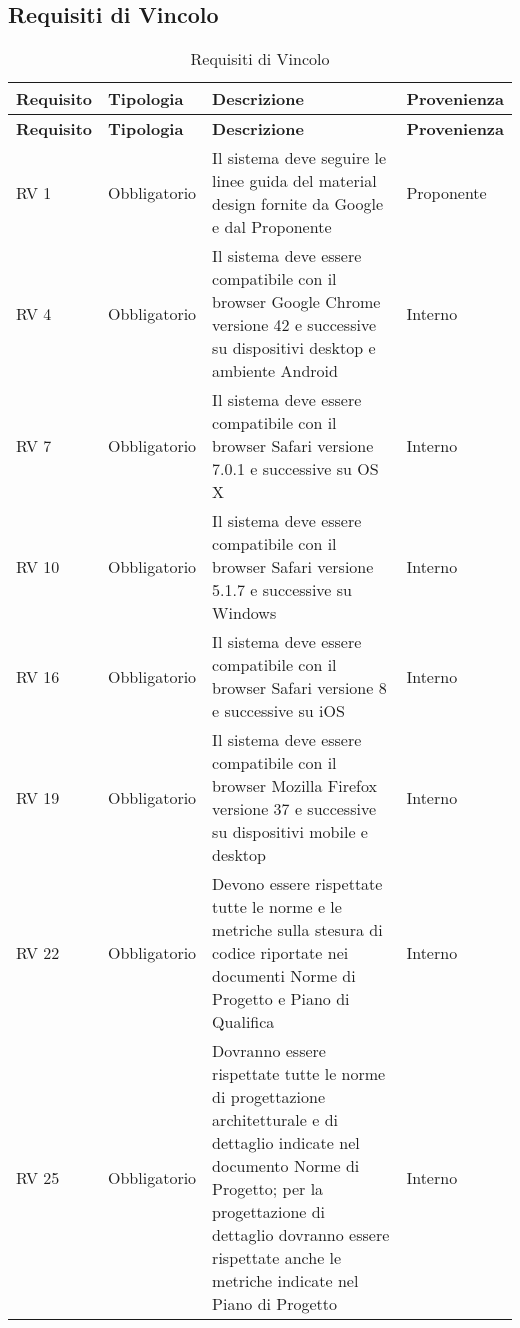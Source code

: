 \subsection{Requisiti di Vincolo}{ 
\renewcommand*{\arraystretch}{1.4} 
\begin{longtable} [c]{| p{2.5cm} | p{2.5cm} | p{6cm} |p{2.5cm}|} 
\caption{Requisiti di Vincolo \label{tab:reqVincolo}}\\ \hline\textbf{Requisito} & \textbf{Tipologia} & \textbf{Descrizione} & \textbf{Provenienza} \\ 
\hline \endfirsthead \hline 
\textbf{Requisito} & \textbf{Tipologia} & \textbf{Descrizione} & \textbf{Provenienza} \\ 
\hline \endhead \hline \endfoot \hline \endlastfoot 
RV 1 & Obbligatorio & Il sistema deve seguire le linee guida del material design fornite da Google e dal Proponente & Proponente\\ 
 \hline 
RV 4 & Obbligatorio & Il sistema deve essere compatibile con il browser Google Chrome versione 42 e successive su dispositivi desktop e ambiente Android & Interno\\ 
 \hline 
RV 7 & Obbligatorio & Il sistema deve essere compatibile con il browser Safari versione 7.0.1 e successive su OS X & Interno\\ 
 \hline 
RV 10 & Obbligatorio & Il sistema deve essere compatibile con il browser Safari versione 5.1.7 e successive su Windows & Interno\\ 
 \hline 
RV 16 & Obbligatorio & Il sistema deve essere compatibile con il browser Safari versione 8 e successive su iOS & Interno\\ 
 \hline 
RV 19 & Obbligatorio & Il sistema deve essere compatibile con il browser Mozilla Firefox versione 37 e successive su dispositivi mobile e desktop & Interno\\ 
 \hline 
RV 22 & Obbligatorio & Devono essere rispettate tutte le norme e le metriche sulla stesura di codice riportate nei documenti Norme di Progetto e Piano di Qualifica & Interno\\ 
 \hline 
RV 25 & Obbligatorio & Dovranno essere rispettate tutte le norme di progettazione architetturale e di dettaglio indicate nel documento Norme di Progetto; per la progettazione di dettaglio dovranno essere rispettate anche le metriche indicate nel Piano di Progetto & Interno\\ 
 \hline 
\end{longtable}}